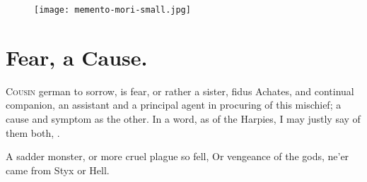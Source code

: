 {\cleartoleftpage{}
\begin{figure}[p]
  \begingroup
  \centering
  \texttt{[image: memento-mori-small.jpg]}
  \label{fig:mementomori}
\end{figure}

\clearpage{}
\thispagestyle{titleontop}
\section{Fear, a Cause.}

\lettrine{C}{ousin} german to sorrow, is fear, or rather a sister, fidus Achates,
and continual companion, an assistant and a principal agent in
procuring of this mischief; a cause and symptom as the other. In a
word, as \Virgil{} of the Harpies, I may justly say of them both,
.

A sadder monster, or more cruel plague so fell,
Or vengeance of the gods, ne'er came from Styx or Hell.

}
